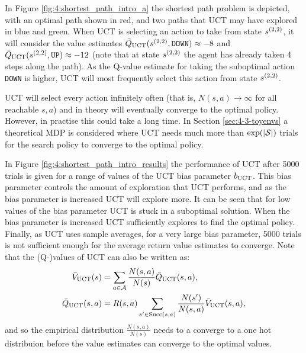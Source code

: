         In Figure \ref{fig:4:shortest_path_intro_a} the shortest path problem is depicted, with an optimal path shown in red, and two paths that UCT may have explored in blue and green. When UCT is selecting an action to take from state $s^{(2,2)}$, it will consider the value estimates ${\bar{Q}_{{\textnormal{UCT}}}}(s^{(2,2)},\texttt{DOWN})\approx -8$ and $ {\bar{Q}_{{\textnormal{UCT}}}}(s^{(2,2)},\texttt{UP})\approx -12$ (note that at state $s^{(2,2)}$ the agent has already taken 4 steps along the path). As the Q-value estimate for taking the suboptimal action \texttt{DOWN} is higher, UCT will most frequently select this action from state $s^{(2,2)}$. 

        UCT will select every action infinitely often (that is, $N(s,a)\rightarrow \infty$ for all reachable $s,a$) and in theory will eventually converge to the optimal policy. However, in practise this could take a long time. In Section \ref{sec:4-3-toyenvs} a theoretical MDP is considered where UCT needs much more than $\exp(|\mathcal{S}|)$ trials for the search policy to converge to the optimal policy.

        In Figure \ref{fig:4:shortest_path_intro_results} the performance of UCT after 5000 trials is given for a range of values of the UCT bias parameter ${b_{{\textnormal{UCT}}}}$. This bias parameter controls the amount of exploration that UCT performs, and as the bias parameter is increased UCT will explore more. It can be seen that for low values of the bias parameter UCT is stuck in a suboptimal solution. When the bias parameter is increased UCT sufficiently explores to find the optimal policy. Finally, as UCT uses sample averages, for a very large bias parameter, 5000 trials is not sufficient enough for the average return value estimates to converge. Note that the (Q-)values of UCT can also be written as:
        \begin{align}
            {\bar{V}_{{\textnormal{UCT}}}}(s) &= \sum_{a \in \mathcal{A}} \frac{N(s,a)}{N(s)}{\bar{Q}_{{\textnormal{UCT}}}}(s,a), \\
            {\bar{Q}_{{\textnormal{UCT}}}}(s,a) &= R(s,a) \sum_{s' \in {\textnormal{Succ}(s,a)}} \frac{N(s')}{N(s,a)}{\bar{V}_{{\textnormal{UCT}}}}(s,a),
        \end{align} 
        and so the empirical distribution $\frac{N(s,a)}{N(s)}$ needs to a converge to a one hot distribuion before the value estimates can converge to the optimal values.
        


    
    
